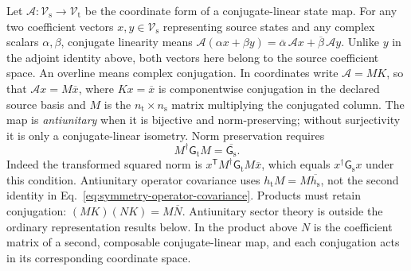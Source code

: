 \begin{definition}
\label{def:symmetry-antiunitary-map}
Let $\mathcal A:\mathcal V_{\mathrm s}\to\mathcal V_{\mathrm t}$ be the
coordinate form of a conjugate-linear state map. For any two coefficient
vectors $x,y\in\mathcal V_{\mathrm s}$ representing source states and any
complex scalars $\alpha,\beta$, conjugate linearity means
$\mathcal A(\alpha x+\beta y)=\overline\alpha\,\mathcal A x
+\overline\beta\,\mathcal A y$.
Unlike $y$ in the adjoint identity above, both vectors here belong to the
source coefficient space. An overline means complex conjugation. In coordinates write
$\mathcal A=MK$, so that $\mathcal A x=M\overline x$, where
$Kx=\overline x$ is componentwise conjugation in the declared source basis
and $M$ is the $n_{\mathrm t}\times n_{\mathrm s}$ matrix multiplying the
conjugated column. The map is \emph{antiunitary} when it is bijective
and norm-preserving; without surjectivity it is only a conjugate-linear
isometry. Norm preservation requires
\begin{equation}
  M^{\dagger}\mathsf G_{\mathrm t}M=\overline{\mathsf G_{\mathrm s}}.
  \label{eq:symmetry-antiunitary-metric}
\end{equation}
Indeed the transformed squared norm is
$x^{\mathsf T}M^{\dagger}\mathsf G_{\mathrm t}M\overline{x}$, which equals
$x^{\dagger}\mathsf G_{\mathrm s}x$ under this condition. Antiunitary operator
covariance uses $h_{\mathrm t}M=M\overline{h_{\mathrm s}}$, not the second
identity in Eq.~\eqref{eq:symmetry-operator-covariance}. Products must retain
conjugation: $(MK)(NK)=M\overline N$. Antiunitary sector theory is outside the
ordinary representation results below. In the product above $N$ is the
coefficient matrix of a second, composable conjugate-linear map, and each
conjugation acts in its corresponding coordinate space.
\end{definition}

